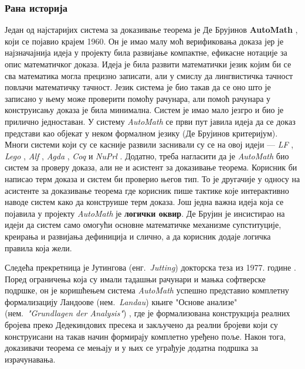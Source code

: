 \subsubsection{Рана историја}

Један од најстаријих система за доказивање теорема је Де Брујинов
\textbf{AutoMath} \cite{automath}, који се појавио крајем 1960. Он је
имао малу моћ верификовања доказа јер је најзначајнија идеја у
пројекту била развијање компактне, ефикасне нотације за опис
математичког доказа. Идеја је била развити математички језик којим би
се сва математика могла прецизно записати, али у смислу да
лингвистичка тачност повлачи математичку тачност. Језик система је био
такав да се оно што је записано у њему може проверити помоћу рачунара,
али помоћ рачунара у конструисању доказа је била минимална. Систем је
имао мало језгро и био је прилично једноставан. У систему
\emph{AutoMath} се први пут јавила идеја да се доказ представи као
објекат у неком формалном језику (Де Брујинов критеријум). Многи
системи који су се касније развили заснивали су се на овој идеји ---
\emph{LF} \cite{lf1993}, \emph{Lego} \cite{lego1992}, \emph{Alf}
\cite{alf1994}, \emph{Agda} \cite{agda}, \emph{Coq} \cite{coq} и
\emph{NuPrl} \cite{nuprl86}.  Додатно, треба нагласити да је
\emph{AutoMath} био систем за проверу доказа, али не и асистент за
доказивање теорема. Корисник би написао терм доказа и систем би
проверио његов тип. То је другачије у односу на асистенте за
доказивање теорема где корисник пише тактике које интерактивно наводе
систем како да конструише терм доказа.  Још једна важна идеја која се
појавила у пројекту \emph{AutoMath} је \textbf{логички оквир}. Де
Брујин је инсистирао на идеји да систем само омогући основне
математичке механизме супституције, креирања и развијања дефиниција и
слично, а да корисник додаје логичка правила која жели.

Следећа прекретница је Јутингова (енг.~\emph{Jutting}) докторска теза
из 1977. године \cite{jutting}. Поред ограничења која су имали тадашњи
рачунари и мањка софтверске подршке, он је коришћењем система
\emph{AutoMath} успешно представио комплетну формализацију Ландоове
(нем.~\emph{Landau}) књиге "Основе анализе"
(нем.~\emph{"Grundlagen der Analysis"}) \cite{landau1960grundlagen},
где је формализована конструкција реалних бројева преко Дедекиндових
пресека и закључено да реални бројеви који су конструисани на такав
начин формирају комплетно уређено поље.  Након тога, доказивачи
теорема се мењају и у њих се уграђује додатна подршка за израчунавања.

